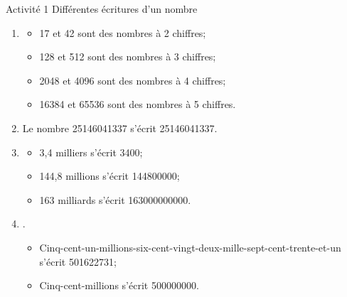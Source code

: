 \documentclass[xcolor={dvipsnames}]{beamer}
\begin{document}
\begin{frame}{}

	\begin{block}{Activité 1 Différentes écritures d'un nombre}
		\begin{enumerate}\pause
			\item 
			\begin{itemize}
				\item 17 et 42 sont des nombres à 2 chiffres;\pause
				\item 128 et 512 sont des nombres à 3 chiffres;\pause
				\item \num{2048} et \num{4096} sont des nombres à 4 chiffres;\pause
				\item \num{16384} et \num{65536} sont des nombres à 5 chiffres.\pause
			\end{itemize}
			
			\item Le nombre 25146041337 s'écrit \num{25146041337}.\pause
			\item 
			\begin{itemize}
				\item 3,4 milliers s'écrit \num{3400};\pause
				\item 144,8 millions s'écrit \num{144800000};\pause
				\item 163 milliards s'écrit \num{163000000000}.\pause
			\end{itemize}
			
			\item .
			\begin{itemize}
				\item Cinq-cent-un-millions-six-cent-vingt-deux-mille-sept-cent-trente-et-un s'écrit \num{501622731};\pause
				\item Cinq-cent-millions s'écrit \num{500000000}.\pause
			\end{itemize}
			
		\end{enumerate}
	\end{block}
\end{frame}
\end{document}
